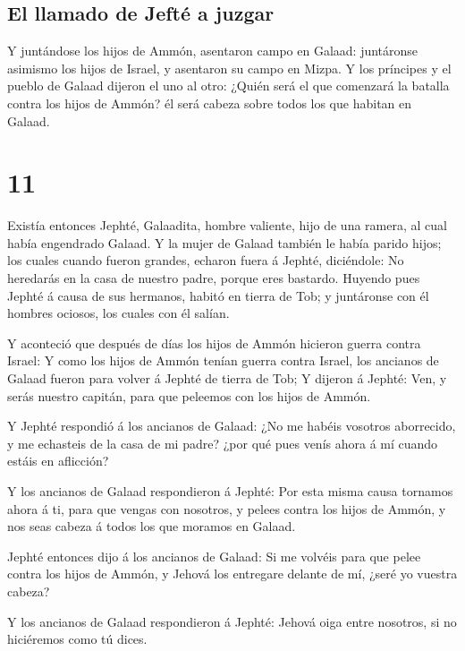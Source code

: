 \hypertarget{el-llamado-de-jeftuxe9-a-juzgar}{%
\subsection{El llamado de Jefté a
juzgar}\label{el-llamado-de-jeftuxe9-a-juzgar}}

 Y juntándose los hijos de Ammón, asentaron campo en
Galaad: juntáronse asimismo los hijos de Israel, y asentaron su campo en
Mizpa.  Y los príncipes y el pueblo de Galaad dijeron el
uno al otro: ¿Quién será el que comenzará la batalla contra los hijos de
Ammón? él será cabeza sobre todos los que habitan en Galaad.

\hypertarget{section-10}{%
\section{11}\label{section-10}}

 Existía entonces Jephté, Galaadita, hombre valiente, hijo
de una ramera, al cual había engendrado Galaad.  Y la mujer
de Galaad también le había parido hijos; los cuales cuando fueron
grandes, echaron fuera á Jephté, diciéndole: No heredarás en la casa de
nuestro padre, porque eres bastardo.  Huyendo pues Jephté á
causa de sus hermanos, habitó en tierra de Tob; y juntáronse con él
hombres ociosos, los cuales con él salían.

 Y aconteció que después de días los hijos de Ammón hicieron
guerra contra Israel:  Y como los hijos de Ammón tenían
guerra contra Israel, los ancianos de Galaad fueron para volver á Jephté
de tierra de Tob;  Y dijeron á Jephté: Ven, y serás nuestro
capitán, para que peleemos con los hijos de Ammón.

 Y Jephté respondió á los ancianos de Galaad: ¿No me habéis
vosotros aborrecido, y me echasteis de la casa de mi padre? ¿por qué
pues venís ahora á mí cuando estáis en aflicción?

 Y los ancianos de Galaad respondieron á Jephté: Por esta
misma causa tornamos ahora á ti, para que vengas con nosotros, y pelees
contra los hijos de Ammón, y nos seas cabeza á todos los que moramos en
Galaad.

 Jephté entonces dijo á los ancianos de Galaad: Si me
volvéis para que pelee contra los hijos de Ammón, y Jehová los entregare
delante de mí, ¿seré yo vuestra cabeza?

 Y los ancianos de Galaad respondieron á Jephté: Jehová
oiga entre nosotros, si no hiciéremos como tú dices.

